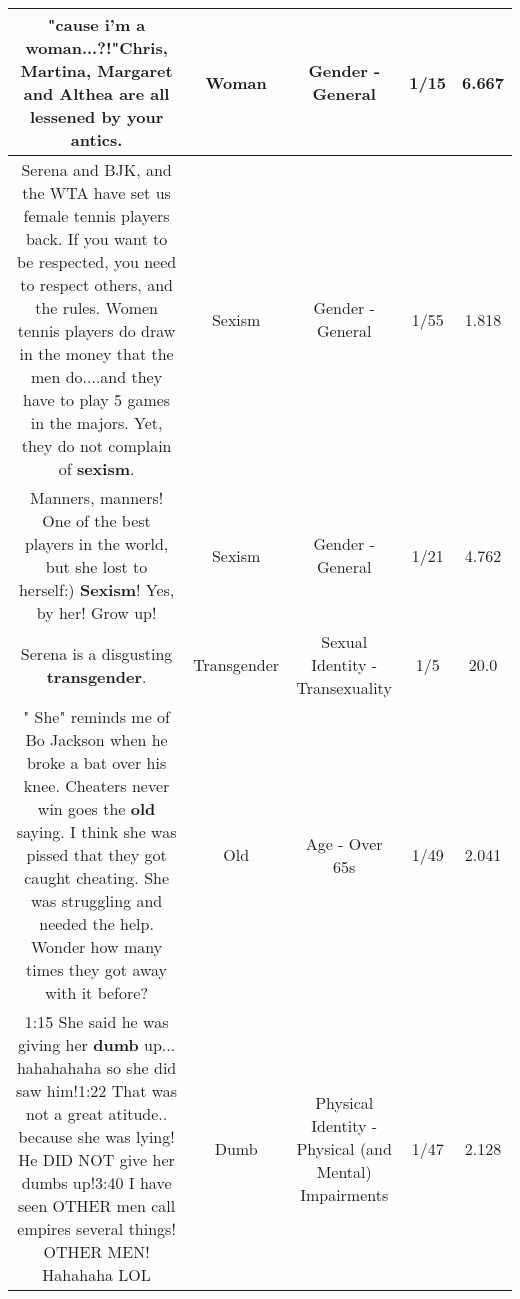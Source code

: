 \documentclass[11pt]{article}
\newlength\mylength
\begin{document}
\begin{center}
\begin{longtable}{|C{.65\mylength}|C{.30\mylength}|C{.12\mylength}|C{.12\mylength}|C{.12\mylength}|}
  \small "cause i'm a \textbf{woman}...?!"Chris, Martina, Margaret and Althea are all lessened by your antics.\normalsize   & Woman & Gender - General & 1/15 & 6.667 \\  \hline
  \small Serena and BJK, and the WTA have set us female tennis players back.  If you want to be respected, you need to respect others, and the rules. Women tennis players do draw in the money that the men do....and they have to play 5 games in the majors.  Yet, they do not complain of \textbf{sexism}.\normalsize   & Sexism & Gender - General & 1/55 & 1.818 \\  \hline
  \small Manners, manners! One of the best players in the world, but she lost to herself:) \textbf{Sexism}! Yes, by her! Grow up!\normalsize   & Sexism & Gender - General & 1/21 & 4.762 \\  \hline
  \small Serena is a disgusting \textbf{transgender}.\normalsize   & Transgender & Sexual Identity - Transexuality & 1/5 & 20.0 \\  \hline
  \small " She" reminds me of Bo Jackson when he broke a bat over his knee. Cheaters never win goes the \textbf{old} saying. I think she was pissed that they got caught cheating. She was struggling and needed the help. Wonder how many times they got away with it before?\normalsize   & Old & Age - Over 65s & 1/49 & 2.041 \\  \hline
  \small 1:15 She said he was giving her \textbf{dumb} up... hahahahaha so she did saw him!1:22 That was not a great atitude.. because she was lying! He DID NOT give her dumbs up!3:40 I have seen OTHER men call empires several things! OTHER MEN! Hahahaha LOL\normalsize   & Dumb & Physical Identity - Physical (and Mental) Impairments & 1/47 & 2.128 \\  \hline

\end{longtable}
\end{center}
\end{document}
